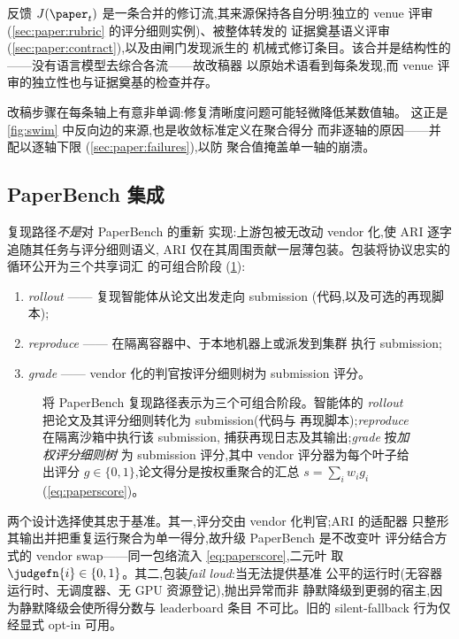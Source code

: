 反馈 $J(\paper_t)$ 是一条合并的修订流,其来源保持各自分明:独立的
venue 评审(\cref{sec:paper:rubric} 的评分细则实例)、被整体转发的
证据奠基语义评审(\cref{sec:paper:contract}),以及由闸门发现派生的
机械式修订条目。该合并是结构性的——没有语言模型去综合各流——故改稿器
以原始术语看到每条发现,而 venue 评审的独立性也与证据奠基的检查并存。

改稿步骤在每条轴上有意非单调:修复清晰度问题可能轻微降低某数值轴。
这正是 \cref{fig:swim} 中反向边的来源,也是收敛标准定义在聚合得分
而非逐轴的原因——并配以逐轴下限 (\cref{sec:paper:failures}),以防
聚合值掩盖单一轴的崩溃。

\subsection{PaperBench 集成}\label{sec:paper:paperbench}

复现路径\emph{不是}对 PaperBench \cite{starace2025paperbench} 的重新
实现:上游包被无改动 vendor 化,使 ARI 逐字追随其任务与评分细则语义,
ARI 仅在其周围贡献一层薄包装。包装将协议忠实的循环公开为三个共享词汇
的可组合阶段 (\cref{fig:pb-stages}):

\begin{enumerate}
  \item \emph{rollout} —— 复现智能体从论文出发走向 submission
        (代码,以及可选的再现脚本);
  \item \emph{reproduce} —— 在隔离容器中、于本地机器上或派发到集群
        执行 submission;
  \item \emph{grade} —— vendor 化的判官按评分细则树为 submission
        评分。
\end{enumerate}

\begin{figure}[t]
  \centering
  \resizebox{\textwidth}{!}{}
  \caption{将 PaperBench 复现路径表示为三个可组合阶段。智能体的
           \emph{rollout} 把论文及其评分细则转化为 submission(代码与
           再现脚本);\emph{reproduce} 在隔离沙箱中执行该 submission,
           捕获再现日志及其输出;\emph{grade} 按\emph{加权评分细则树}
           为 submission 评分,其中 vendor 评分器为每个叶子给出评分
           $g\in\{0,1\}$,论文得分是按权重聚合的汇总
           $s=\sum_i w_i g_i$(\cref{eq:paperscore})。}
  \label{fig:pb-stages}
\end{figure}

两个设计选择使其忠于基准。其一,评分交由 vendor 化判官;ARI 的适配器
只整形其输出并把重复运行聚合为单一得分,故升级 PaperBench 是不改变叶
评分结合方式的 vendor swap——同一包络流入 \cref{eq:paperscore},二元叶
取 $\judgefn{i}\in\{0,1\}$。其二,包装\emph{fail loud}:当无法提供基准
公平的运行时(无容器运行时、无调度器、无 GPU 资源登记),抛出异常而非
静默降级到更弱的宿主,因为静默降级会使所得分数与 leaderboard 条目
不可比。旧的 silent-fallback 行为仅经显式 opt-in 可用。

